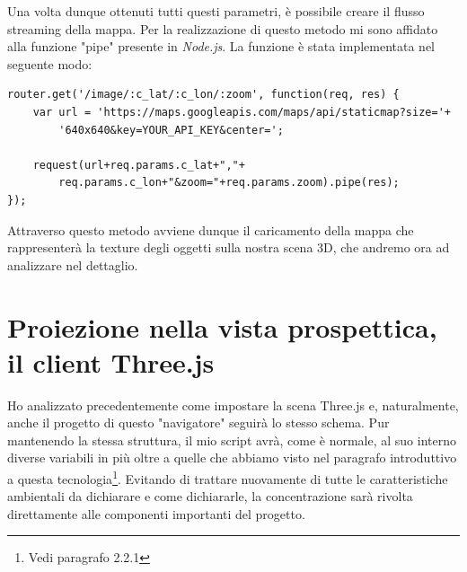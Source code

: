 Una volta dunque ottenuti tutti questi parametri, è possibile creare il flusso streaming della mappa. Per la realizzazione di questo metodo mi sono affidato alla funzione "pipe" presente in \textit{Node.js}. La funzione è stata implementata nel seguente modo: 
\begin{verbatim}
router.get('/image/:c_lat/:c_lon/:zoom', function(req, res) {
    var url = 'https://maps.googleapis.com/maps/api/staticmap?size='+
    	'640x640&key=YOUR_API_KEY&center=';

    request(url+req.params.c_lat+","+
    	req.params.c_lon+"&zoom="+req.params.zoom).pipe(res);
});
\end{verbatim}
Attraverso questo metodo avviene dunque il caricamento della mappa che rappresenterà la texture degli oggetti sulla nostra scena 3D, che andremo ora ad analizzare nel dettaglio.

\section{Proiezione nella vista prospettica, il client Three.js}
Ho analizzato precedentemente come impostare la scena Three.js e, naturalmente, anche il progetto di questo "navigatore" seguirà lo stesso schema. Pur mantenendo la stessa struttura, il mio script avrà, come è normale, al suo interno diverse variabili in più oltre a quelle che abbiamo visto nel paragrafo introduttivo a questa tecnologia\footnote{Vedi paragrafo 2.2.1}. Evitando di trattare nuovamente di tutte le caratteristiche ambientali da dichiarare e come dichiararle, la concentrazione sarà rivolta direttamente alle componenti importanti del progetto.

